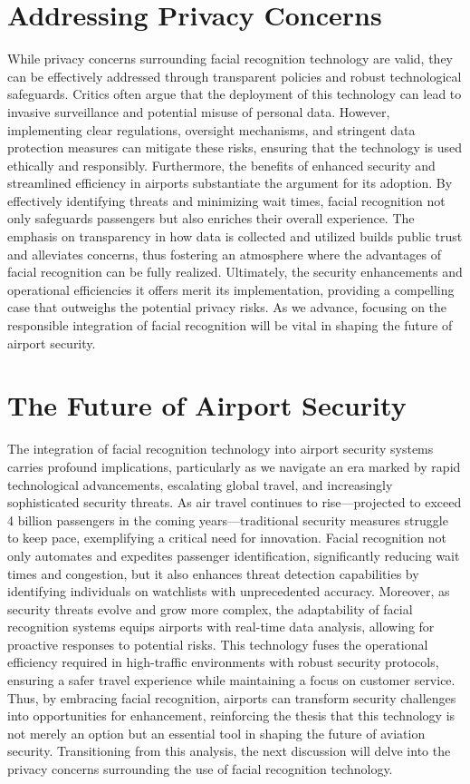 \documentclass{article}%
\begin{document}
%
\section*{Addressing Privacy Concerns}%
\label{sec:AddressingPrivacyConcerns}%
While privacy concerns surrounding facial recognition technology are valid, they can be effectively addressed through transparent policies and robust technological safeguards. Critics often argue that the deployment of this technology can lead to invasive surveillance and potential misuse of personal data. However, implementing clear regulations, oversight mechanisms, and stringent data protection measures can mitigate these risks, ensuring that the technology is used ethically and responsibly. Furthermore, the benefits of enhanced security and streamlined efficiency in airports substantiate the argument for its adoption. By effectively identifying threats and minimizing wait times, facial recognition not only safeguards passengers but also enriches their overall experience. The emphasis on transparency in how data is collected and utilized builds public trust and alleviates concerns, thus fostering an atmosphere where the advantages of facial recognition can be fully realized. Ultimately, the security enhancements and operational efficiencies it offers merit its implementation, providing a compelling case that outweighs the potential privacy risks. As we advance, focusing on the responsible integration of facial recognition will be vital in shaping the future of airport security.

%
\section*{The Future of Airport Security}%
\label{sec:TheFutureofAirportSecurity}%
The integration of facial recognition technology into airport security systems carries profound implications, particularly as we navigate an era marked by rapid technological advancements, escalating global travel, and increasingly sophisticated security threats. As air travel continues to rise—projected to exceed 4 billion passengers in the coming years—traditional security measures struggle to keep pace, exemplifying a critical need for innovation. Facial recognition not only automates and expedites passenger identification, significantly reducing wait times and congestion, but it also enhances threat detection capabilities by identifying individuals on watchlists with unprecedented accuracy. Moreover, as security threats evolve and grow more complex, the adaptability of facial recognition systems equips airports with real{-}time data analysis, allowing for proactive responses to potential risks. This technology fuses the operational efficiency required in high{-}traffic environments with robust security protocols, ensuring a safer travel experience while maintaining a focus on customer service. Thus, by embracing facial recognition, airports can transform security challenges into opportunities for enhancement, reinforcing the thesis that this technology is not merely an option but an essential tool in shaping the future of aviation security. Transitioning from this analysis, the next discussion will delve into the privacy concerns surrounding the use of facial recognition technology.
\end{document}
